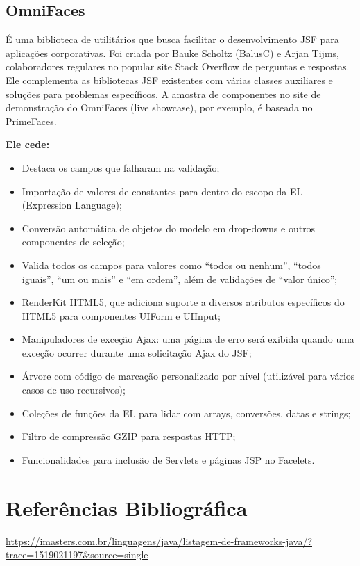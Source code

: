 \documentclass[12pt,a4paper]{article}
\begin{document}
\subsection{OmniFaces}
É uma biblioteca de utilitários que busca facilitar o desenvolvimento JSF para aplicações corporativas. Foi criada por Bauke Scholtz (BalusC) e Arjan Tijms, colaboradores regulares no popular site Stack Overflow de perguntas e respostas. Ele complementa as bibliotecas JSF existentes com várias classes auxiliares e soluções para problemas específicos. A amostra de componentes no site de demonstração do OmniFaces (live showcase), por exemplo, é baseada no PrimeFaces. 

\textbf{Ele cede:}
\begin{itemize}
\item Destaca os campos que falharam na validação;

\item Importação de valores de constantes para dentro do escopo da EL (Expression Language);

\item Conversão automática de objetos do modelo em drop-downs e outros componentes de seleção;

\item Valida todos os campos para valores como “todos ou nenhum”, “todos iguais”, “um ou mais” e “em ordem”, além de validações de “valor único”;

\item RenderKit HTML5, que adiciona suporte a diversos atributos específicos do HTML5 para componentes UIForm e UIInput;

\item Manipuladores de exceção Ajax: uma página de erro será exibida quando uma exceção ocorrer durante uma solicitação Ajax do JSF;

\item Árvore com código de marcação personalizado por nível (utilizável para vários casos de uso recursivos);

\item Coleções de funções da EL para lidar com arrays, conversões, datas e strings;

\item Filtro de compressão GZIP para respostas HTTP;

\item Funcionalidades para inclusão de Servlets e páginas JSP no Facelets.

\end{itemize}

\section{Referências Bibliográfica}
\noindent 
\url {https://imasters.com.br/linguagens/java/listagem-de-frameworks-java/?trace=1519021197&source=single}
\\\vspace{0.2cm}
\end{document}
